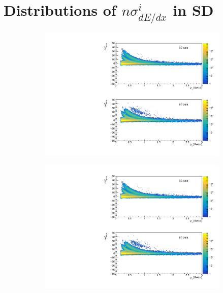 
\chapter{Distributions of $n\sigma^{i}_{dE/dx}$ in SD}\label{appendix:dEdxFits}

\begin{figure}[H]
	\centering
	\parbox{0.3\textwidth}{
		\centering
		\begin{subfigure}[b]{\linewidth}{
				{\includegraphics[width=\linewidth, page=2]{graphics/pid/spectraFit_SDT.pdf}}}
		\end{subfigure}
	}
	\quad
	\parbox{0.3\textwidth}{
		\centering
		\begin{subfigure}[b]{\linewidth}{
				{\includegraphics[width=\linewidth, page=3]{graphics/pid/spectraFit_SDT.pdf}}}

\end{subfigure}}
\end{figure}
